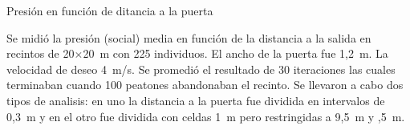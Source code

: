 {\Large Presión en función de ditancia a la puerta}

Se midió la presión (social) media en función de la distancia a la salida en recintos de 20$\times$20~m con 225 individuos. El ancho de la puerta fue 1,2~m. La velocidad de deseo 4~m/s. Se promedió el resultado de 30 iteraciones las cuales terminaban cuando 100 peatones abandonaban el recinto. Se llevaron a cabo dos tipos de analisis: en uno la distancia a la puerta fue dividida en intervalos de 0,3~m y en el otro fue dividida con celdas 1~m pero restringidas a 9,5~m \le y ,5~m. 





